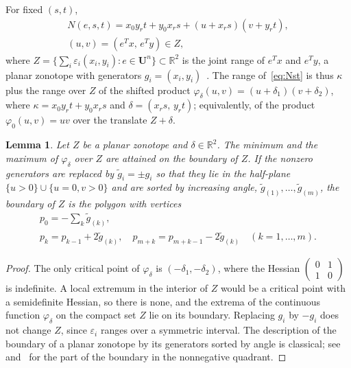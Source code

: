 \documentclass[10pt]{article}
\newtheorem{lemma}{Lemma}
\theoremstyle{definition}
\newcommand{\U}{\mathbf{U}}
\newcommand{\R}{\mathbb{R}}
\newcommand{\eps}{\varepsilon}
\begin{document}
For fixed $(s,t)$,
\begin{equation}
\label{eq:Nst}
\begin{gathered}N(e,s,t) = x_0y_rt+y_0x_rs + (u + x_rs)(v + y_rt),\\ (u,v)=(e^Tx,\,e^Ty)\in Z,\end{gathered}
\end{equation}
where $Z=\{\sum_i\eps_i(x_i,y_i): e\in\U^n\}\subset\R^2$ is the joint range of $e^Tx$ and $e^Ty$, a planar zonotope with generators $g_i=(x_i,y_i)$~\cite{ziegler1995lectures}. The range of~\eqref{eq:Nst} is thus $\kappa$ plus the range over $Z$ of the shifted product $\varphi_\delta(u,v)=(u+\delta_1)(v+\delta_2)$, where $\kappa=x_0y_rt+y_0x_rs$ and $\delta=(x_rs,\,y_rt)$; equivalently, of the product $\varphi_0(u,v)=uv$ over the translate $Z+\delta$.

\begin{lemma}
\label{lem:zonotope}
Let $Z$ be a planar zonotope and $\delta\in\R^2$. The minimum and the maximum of $\varphi_\delta$ over $Z$ are attained on the boundary of $Z$. If the nonzero generators are replaced by $\tilde g_i=\pm g_i$ so that they lie in the half-plane $\{u>0\}\cup\{u=0,v>0\}$ and are sorted by increasing angle, $\tilde g_{(1)},\dots,\tilde g_{(m)}$, the boundary of $Z$ is the polygon with vertices
\begin{equation}
\label{eq:boundary}
\begin{gathered}p_0=-\sum_k\tilde g_{(k)},\\ p_k = p_{k-1}+2\tilde g_{(k)},\quad p_{m+k} = p_{m+k-1}-2\tilde g_{(k)}\quad (k=1,\dots,m).\end{gathered}
\end{equation}
\end{lemma}
\begin{proof}
The only critical point of $\varphi_\delta$ is $(-\delta_1,-\delta_2)$, where the Hessian $\left(\begin{smallmatrix}0&1\\1&0\end{smallmatrix}\right)$ is indefinite. A local extremum in the interior of $Z$ would be a critical point with a semidefinite Hessian, so there is none, and the extrema of the continuous function $\varphi_\delta$ on the compact set $Z$ lie on its boundary. Replacing $g_i$ by $-g_i$ does not change $Z$, since $\eps_i$ ranges over a symmetric interval. The description of the boundary of a planar zonotope by its generators sorted by angle is classical; see~\cite{ziegler1995lectures} and~\cite[Prop.~7]{skalna2017new} for the part of the boundary in the nonnegative quadrant.
\end{proof}
\end{document}
